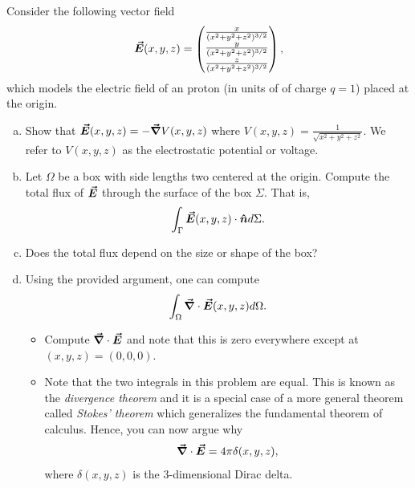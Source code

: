 \documentclass[12pt]{article} %
\begin{document}
\newpage
\begin{problem}
Consider the following vector field
\[
\boldsymbol{\vec{E}}(x,y,z) = \begin{pmatrix} \frac{x}{(x^2+y^2+z^2)^{3/2}} \\ \frac{y}{(x^2+y^2+z^2)^{3/2}} \\ \frac{z}{(x^2+y^2+z^2)^{3/2}} \end{pmatrix},
\]
which models the electric field of an proton (in units of of charge $q=1$) placed at the origin.
\begin{enumerate}[(a)]
	\item Show that $\boldsymbol{\vec{E}}(x,y,z) = - \boldsymbol{\vec{\nabla}} V(x,y,z)$ where $V(x,y,z) = \frac{1}{\sqrt{x^2+y^2+z^2}}$.  We refer to $V(x,y,z)$ as the electrostatic potential or voltage.
	\item Let $\Omega$ be a box with side lengths two centered at the origin.  Compute the total flux of $\boldsymbol{\vec{E}}$ through the surface of the box $\Sigma$. That is,
	\[
	\int_\Gamma \boldsymbol{\vec{E}}(x,y,z) \cdot \boldsymbol{\hat{n}} d\Sigma.
	\]
 	\item Does the total flux depend on the size or shape of the box?
	\item Using the provided argument, one can compute
	\[
	\int_\Omega \boldsymbol{\vec{\nabla}} \cdot \boldsymbol{\vec{E}}(x,y,z) d\Omega.
	\]
	\begin{itemize}
		\item Compute $\boldsymbol{\vec{\nabla}} \cdot \boldsymbol{\vec{E}}$ and note that this is zero everywhere except at $(x,y,z)=(0,0,0)$.
		\item Note that the two integrals in this problem are equal. This is known as the \emph{divergence theorem} and it is a special case of a more general theorem called \emph{Stokes' theorem} which generalizes the fundamental theorem of calculus. Hence, you can now argue why
		\[
		\boldsymbol{\vec{\nabla}}\cdot \boldsymbol{\vec{E}} = 4\pi\delta(x,y,z),
		\]
		where $\delta(x,y,z)$ is the 3-dimensional Dirac delta.
	\end{itemize}
\end{enumerate}
\end{problem}
\end{document}
